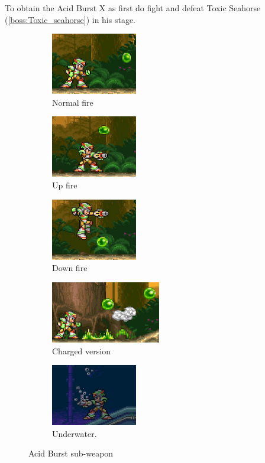 To obtain the Acid Burst X as first do fight and defeat Toxic Seahorse (\ref{boss:Toxic_seahorse}) in his stage.

\begin{figure}[htp]
	\centering
	\begin{subfigure}{3.9cm}
		\includegraphics[height=2.7cm]{figures/X3/weapons/A_burst.png}
		\caption{Normal fire}	
	\end{subfigure}
	\begin{subfigure}{3.9cm}
		\includegraphics[height=2.7cm]{figures/X3/weapons/A_burst_up.png}	
		\caption{Up fire}
	\end{subfigure}
	\begin{subfigure}{3.9cm}
		\includegraphics[height=2.7cm]{figures/X3/weapons/A_burst_Down.png}	
		\caption{Down fire}
	\end{subfigure}
	\begin{subfigure}{0.4\linewidth}
		\centering
		\includegraphics[height=2.7cm]{figures/X3/weapons/A_burst_charge.png}
		\caption{Charged version}	
	\end{subfigure}
	\begin{subfigure}{0.4\linewidth}
		\centering
		\includegraphics[height=2.7cm]{figures/X3/weapons/A_burst_water.png}
		\caption{Underwater.}
	\end{subfigure}
	\caption{Acid Burst sub-weapon}
\end{figure}


